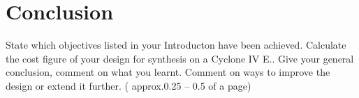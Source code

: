 \section{Conclusion}
\review
{
	State which objectives listed in your Introducton have been achieved. Calculate the cost figure of your design for synthesis on a Cyclone IV E.. Give your general  conclusion, comment on what you learnt.  Comment on ways to improve the design or extend it further.  ( approx.0.25 – 0.5 of a page)
}
